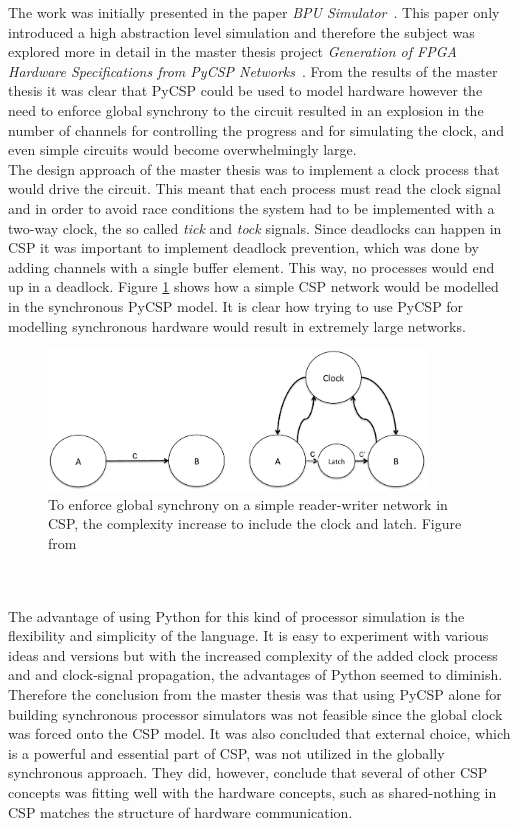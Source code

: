 The work was initially presented in the paper \textit{BPU Simulator}~\cite{Rehr2013}. This paper only introduced a high abstraction level simulation and therefore the subject was explored more in detail in the master thesis project \textit{Generation of FPGA Hardware
Specifications from PyCSP Networks}~\cite{Skaarup14}. From the results of the master thesis it was clear that PyCSP could be used to model hardware however the need to enforce global synchrony to the circuit resulted in an explosion in the number of channels for controlling the progress and for simulating the clock, and even simple circuits would become overwhelmingly large.\\

The design approach of the master thesis was to implement a clock process that would drive the circuit. This meant that each process must read the clock signal and in order to avoid race conditions the system had to be implemented with a two-way clock, the so called \textit{tick} and \textit{tock} signals. Since deadlocks can happen in CSP it was important to implement deadlock prevention, which was done by adding channels with a single buffer element. This way, no processes would end up in a deadlock. Figure \ref{fig:sme:clock_latch} shows how a simple CSP network would be modelled in the synchronous PyCSP model. It is clear how trying to use PyCSP for modelling synchronous hardware would result in extremely large networks.
\begin{figure}[h!]
\centering
\includegraphics[width=10.0cm]{figures/clocked.pdf}
\caption{To enforce global synchrony on a simple reader-writer network in CSP, the complexity increase to include the clock and latch. Figure from \cite{Vinter2014}}
\label{fig:sme:clock_latch}
\end{figure}
\\\\
The advantage of using Python for this kind of processor simulation is the flexibility and simplicity of the language. It is easy to experiment with various ideas and versions but with the increased complexity of the added clock process and and clock-signal propagation, the advantages of Python seemed to diminish. Therefore the conclusion from the master thesis was that using PyCSP alone for building synchronous processor simulators was not feasible since the global clock was forced onto the CSP model. It was also concluded that external choice, which is a powerful and essential part of CSP, was not utilized in the globally synchronous approach. They did, however, conclude that several of other CSP concepts was fitting well with the hardware concepts, such as shared-nothing in CSP matches the structure of hardware communication.\\

